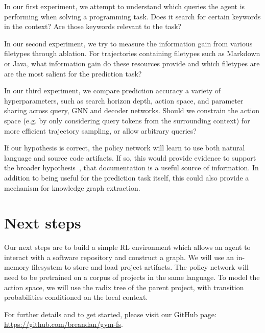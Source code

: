 \documentclass[11pt]{article}
\begin{document}
In our first experiment, we attempt to understand which queries the agent is performing when solving a programming task. Does it search for certain keywords in the context? Are those keywords relevant to the task?

In our second experiment, we try to measure the information gain from various filetypes through ablation. For trajectories containing filetypes such as Markdown or Java, what information gain do these resources provide and which filetypes are are the most salient for the prediction task?

In our third experiment, we compare prediction accuracy a variety of hyperparameters, such as search horizon depth, action space, and parameter sharing across query, GNN and decoder networks. Should we constrain the action space (e.g. by only considering query tokens from the surrounding context) for more efficient trajectory sampling, or allow arbitrary queries?

If our hypothesis is correct, the policy network will learn to use both natural language and source code artifacts. If so, this would provide evidence to support the broader hypothesis~\cite{guo2017semantically}, that documentation is a useful source of information. In addition to being useful for the prediction task itself, this could also provide a mechanism for knowledge graph extraction.

\section{Next steps}

Our next steps are to build a simple RL environment which allows an agent to interact with a software repository and construct a graph. We will use an in-memory filesystem to store and load project artifacts. The policy network will need to be pretrained on a corpus of projects in the same language. To model the action space, we will use the radix tree of the parent project, with transition probabilities conditioned on the local context.

For further details and to get started, please visit our GitHub page: \url{https://github.com/breandan/gym-fs}.

  
  
\end{document}
